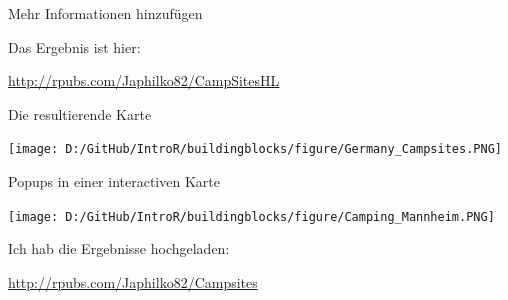 \documentclass[ignorenonframetext,]{beamer}
\newenvironment{Shaded}{\begin{snugshade}}{\end{snugshade}}
\newcommand{\CharTok}[1]{\textcolor[rgb]{0.02,0.61,0.04}{#1}}
\newcommand{\CommentTok}[1]{\textcolor[rgb]{0.00,0.40,1.00}{\textbf{\textit{#1}}}}
\newcommand{\DataTypeTok}[1]{\textcolor[rgb]{0.74,0.68,0.62}{\underline{#1}}}
\newcommand{\KeywordTok}[1]{\textcolor[rgb]{0.26,0.66,0.93}{\textbf{#1}}}
\newcommand{\NormalTok}[1]{\textcolor[rgb]{0.74,0.68,0.62}{#1}}
\newcommand{\OperatorTok}[1]{\textcolor[rgb]{0.74,0.68,0.62}{#1}}
\newcommand{\StringTok}[1]{\textcolor[rgb]{0.02,0.61,0.04}{#1}}
\begin{document}
\begin{frame}[fragile]{Mehr Informationen hinzufügen}
\protect\hypertarget{mehr-informationen-hinzufugen}{}

\begin{Shaded}
\end{Shaded}

\begin{Shaded}
\end{Shaded}

Das Ergebnis ist hier:

\url{http://rpubs.com/Japhilko82/CampSitesHL}

\end{frame}

\begin{frame}{Die resultierende Karte}
\protect\hypertarget{die-resultierende-karte}{}

\texttt{[image: D:/GitHub/IntroR/buildingblocks/figure/Germany\_Campsites.PNG]}

\end{frame}

\begin{frame}{Popups in einer interactiven Karte}
\protect\hypertarget{popups-in-einer-interactiven-karte}{}

\texttt{[image: D:/GitHub/IntroR/buildingblocks/figure/Camping\_Mannheim.PNG]}

Ich hab die Ergebnisse hochgeladen:

\url{http://rpubs.com/Japhilko82/Campsites}

\end{frame}
\end{document}
